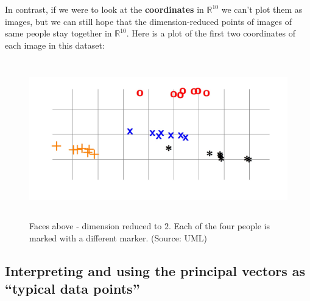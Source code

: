 \documentclass[11pt]{article}
\newcommand{\R}{\ensuremath{\mathbb{R}}}
\begin{document}
In contrast, if we were to look at the {\bf coordinates} in $\R^{10}$ we can't
plot them as images, but we can still hope that the dimension-reduced points of
images of same people stay together in $\R^{10}$. Here is a plot of the first
two coordinates of each image in this dataset:
\begin{figure}[H]
      \centering
      \includegraphics[height=2.7in]{pca_faces_proj.jpeg}        
      \caption{Faces above - dimension reduced to $2$. Each of
        the four people is marked with a different marker. (Source:
      UML)} 
    \end{figure}


\subsection{Interpreting and using the principal vectors as ``typical data
points''}
\end{document}
